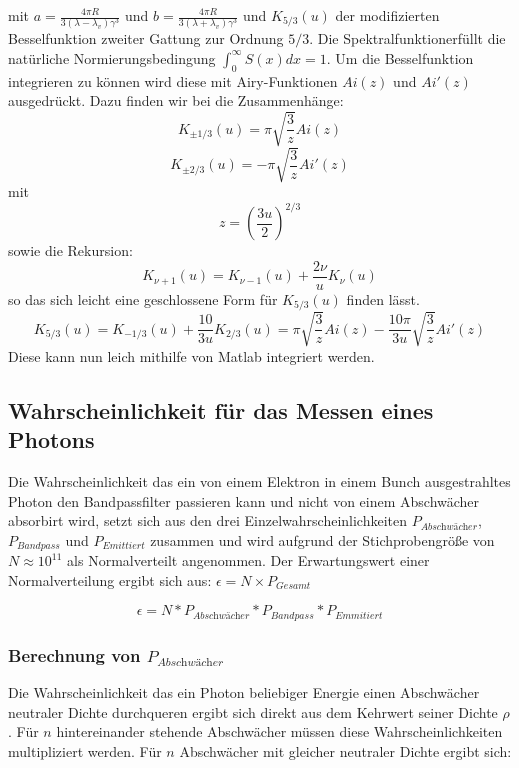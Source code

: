 mit $a = \frac{4\pi R}{3(\lambda-\lambda_{v}) \gamma^3}$ und $b = \frac{4\pi R}{3(\lambda+\lambda_{v}) \gamma^3}$ und $K_{5/3}(u)$
der modifizierten Besselfunktion zweiter Gattung zur Ordnung $5/3$. Die Spektralfunktionerfüllt die natürliche Normierungsbedingung $\int_{0}^{\infty}S(x)dx = 1$. \cite{Wille}
Um die Besselfunktion integrieren zu können wird diese mit Airy-Funktionen $Ai(z)$ und $Ai'(z)$ ausgedrückt. Dazu finden wir bei \cite{DLMF} die Zusammenhänge:
\begin{equation*}
    K_{\pm 1/3}(u) = \pi \sqrt{\frac{3}{z}} Ai\left(z\right)
\end{equation*}
\begin{equation*}
    K_{\pm 2/3}(u) = -\pi \sqrt{\frac{3}{z}} Ai'\left(z\right)
\end{equation*}
    mit 
\begin{equation*}    
    z = \left(\frac{3u}{2}\right)^{2/3}
\end{equation*}
sowie die Rekursion:
\begin{equation*}
    K_{\nu+1}(u) = K_{\nu-1}(u) + \frac{2\nu}{u}K_{\nu}(u)
\end{equation*}
so das sich leicht eine geschlossene Form für $K_{5/3}(u)$ finden lässt. 
\begin{equation*}
    K_{5/3}(u) = K_{-1/3}(u) + \frac{10}{3u}K_{2/3}(u) = \pi \sqrt{\frac{3}{z}} Ai\left(z\right) - \frac{10\pi}{3u}\sqrt{\frac{3}{z}} Ai'\left(z\right)
\end{equation*}
Diese kann nun leich mithilfe von Matlab integriert werden.
\subsection{Wahrscheinlichkeit für das Messen eines Photons}
\label{sec:Wahrscheinlichkeitsrechnung}
Die Wahrscheinlichkeit das ein von einem Elektron in einem Bunch ausgestrahltes Photon
den Bandpassfilter passieren kann und nicht von einem Abschwächer absorbirt wird,
setzt sich aus den drei Einzelwahrscheinlichkeiten $P_{\textit{Abschwächer}}$, $P_{Bandpass}$ und $P_{𝐸𝑚𝑖𝑡𝑡𝑖𝑒𝑟𝑡}$
zusammen und wird aufgrund der Stichprobengröße von $N \approx 10^{11}$ als Normalverteilt
angenommen. Der Erwartungswert einer Normalverteilung ergibt sich aus: $\epsilon = N \times P_{Gesamt}$

\begin{equation*}
    \epsilon = N * P_{\textit{Abschwächer}} * P_{Bandpass} * P_{Emmitiert}
\end{equation*}

\subsubsection{Berechnung von \texorpdfstring{$P_{\textit{Abschwächer}}$}{TEXT}}
\label{sec:PAbschwaecher}
Die Wahrscheinlichkeit das ein Photon beliebiger Energie einen Abschwächer neutraler
Dichte durchqueren ergibt sich direkt aus dem Kehrwert seiner Dichte $\rho$. Für $n$ hintereinander stehende 
Abschwächer müssen diese Wahrscheinlichkeiten multipliziert werden. Für $n$ Abschwächer mit gleicher 
neutraler Dichte ergibt sich:

